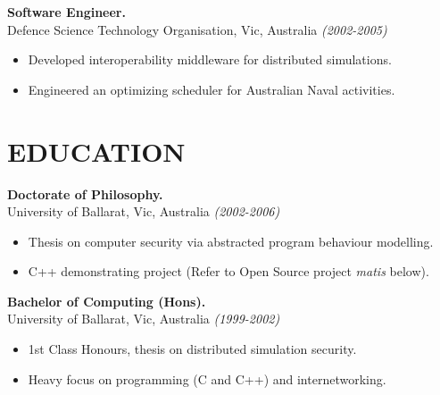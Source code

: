 \documentclass[margin]{res}
\begin{document}
\begin{resume}
{\bf Software Engineer.} \\
Defence Science Technology Organisation, Vic, Australia {\em (2002-2005)} \\
\begin{itemize}
  \item Developed interoperability middleware for distributed simulations.
  \item Engineered an optimizing scheduler for Australian Naval activities.
\end{itemize}





\section{EDUCATION}

{\bf Doctorate of Philosophy.} \\
University of Ballarat, Vic, Australia {\em (2002-2006)} \\
\begin{itemize}
\item Thesis on computer security via abstracted program behaviour modelling.
\item C++ demonstrating project (Refer to Open Source project {\em
  matis} below).
\end{itemize}

{\bf Bachelor of Computing (Hons).} \\
University of Ballarat, Vic, Australia {\em (1999-2002)} \\
\begin{itemize}
\item 1st Class Honours, thesis on distributed simulation security.
\item Heavy focus on programming (C and C++) and internetworking.
\end{itemize}



\end{resume}
\end{document}
